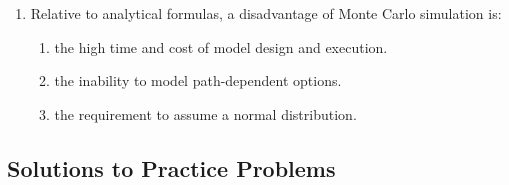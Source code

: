 \begin{enumerate}
	\item Relative to analytical formulas, a disadvantage of Monte Carlo simulation is:
	      \begin{enumerate}[label=\Alph*.]
		      \item the high time and cost of model design and execution.
		      \item the inability to model path-dependent options.
		      \item the requirement to assume a normal distribution.
	      \end{enumerate}
\end{enumerate}

\subsection{Solutions to Practice Problems}
\label{subsec:app_Solutions_M9}

